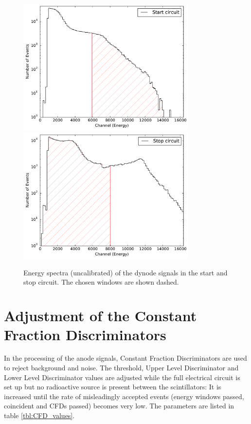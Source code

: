 \documentclass[
	paper=A4,
	parskip=full,
	chapterprefix=true,
	11pt,
	headings=normal,
	bibliography=totoc,
	listof=totoc,
	titlepage=on,
]{scrreprt}
\begin{document}
\begin{figure}[h]
	\centering
	\includegraphics[width=0.8\textwidth]{windows_0}
	\includegraphics[width=0.8\textwidth]{windows_1}
	\caption{Energy spectra (uncalibrated) of the dynode signals in the start and stop circuit. The chosen windows are shown dashed.}
	\label{fig:WD_spectra}
\end{figure}

\FloatBarrier
\section{Adjustment of the Constant Fraction Discriminators}

In the processing of the anode signals, Constant Fraction Discriminators are used to reject background and noise. The threshold, Upper Level Discriminator and Lower Level Discriminator values are adjusted while the full electrical circuit is set up but no radioactive source is present between the scintillators: It is increased until the rate of misleadingly accepted events (energy windows passed, coincident and CFDs passed) becomes very low. The parameters are listed in table \ref{tbl:CFD_values}.
\end{document}

